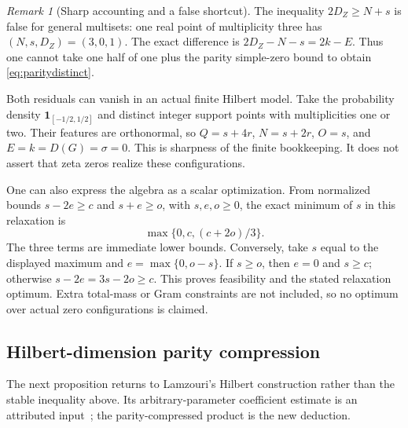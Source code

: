 ﻿\documentclass[11pt]{article}
\theoremstyle{remark}
\newtheorem{remark}[theorem]{Remark}
\begin{document}
\begin{remark}[Sharp accounting and a false shortcut]
The inequality $2D_Z\ge N+s$ is false for general multisets: one real
point of multiplicity three has $(N,s,D_Z)=(3,0,1)$. The exact difference
is $2D_Z-N-s=2k-E$. Thus one cannot take one half of one plus the parity
simple-zero bound to obtain \eqref{eq:paritydistinct}.

Both residuals can vanish in an actual finite Hilbert model. Take the
probability density $\mathbf1_{[-1/2,1/2]}$ and distinct integer support
points with multiplicities one or two. Their features are orthonormal,
so $Q=s+4r$, $N=s+2r$, $O=s$, and $E=k=D(G)=\sigma=0$.
This is sharpness of the finite bookkeeping. It does not assert that zeta
zeros realize these configurations.
\end{remark}

One can also express the algebra as a scalar optimization. From normalized
bounds $s-2e\ge c$ and $s+e\ge o$, with $s,e,o\ge0$, the exact minimum
of $s$ in this relaxation is
\begin{equation}\label{eq:relaxedLP}
 \max\{0,c,(c+2o)/3\}.
\end{equation}
The three terms are immediate lower bounds. Conversely, take $s$ equal
to the displayed maximum and $e=\max\{0,o-s\}$. If $s\ge o$, then
$e=0$ and $s\ge c$; otherwise $s-2e=3s-2o\ge c$. This proves
feasibility and the stated relaxation optimum. Extra total-mass or Gram
constraints are not included, so no optimum over actual zero configurations
is claimed.

\subsection{Hilbert-dimension parity compression}

The next proposition returns to Lamzouri's Hilbert construction rather than
the stable inequality above. Its arbitrary-parameter coefficient estimate is
an attributed input~\cite{Lamzouri,AF}; the parity-compressed product is the
new deduction.
\end{document}
